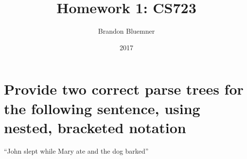 \documentclass[12pt]{article}
\begin{document}
	\title{Homework 1: CS723}
	\author{Brandon Bluemner}
	\date{2017}

	\section{Provide two correct parse trees for the following sentence, using nested, bracketed notation }
	
	``John slept while Mary ate and the dog barked''

	
\end{document}
